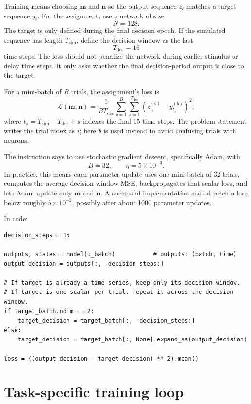 \documentclass[11pt]{article}
\newcommand{\vm}{\mathbf{m}}
\newcommand{\vn}{\mathbf{n}}
\begin{document}
Training means choosing $\vm$ and $\vn$ so the output sequence $z_t$ matches a
target sequence $y_t$. For the assignment, use a network of size
\[
  N = 128.
\]
The target is only defined during the final decision epoch. If the simulated
sequence has length $T_{\mathrm{sim}}$, define the decision window as the last
\[
  T_{\mathrm{dec}} = 15
\]
time steps. The loss should not penalize the network during earlier stimulus or
delay time steps. It only asks whether the final decision-period output is close
to the target.

For a mini-batch of $B$ trials, the assignment's loss is
\begin{equation}
  \mathcal{L}(\vm,\vn)
  =
  \frac{1}{B T_{\mathrm{dec}}}
  \sum_{b=1}^{B}
  \sum_{s=1}^{T_{\mathrm{dec}}}
  \left(
    z_{t_s}^{(b)} - y_{t_s}^{(b)}
  \right)^2,
  \label{eq:decision_loss}
\end{equation}
where $t_s = T_{\mathrm{sim}} - T_{\mathrm{dec}} + s$ indexes the final
15 time steps. The problem statement writes the trial index as $i$; here $b$ is
used instead to avoid confusing trials with neurons.

The instruction says to use stochastic gradient descent, specifically Adam, with
\[
  B = 32,
  \qquad
  \eta = 5 \times 10^{-3}.
\]
In practice, this means each parameter update uses one mini-batch of 32 trials,
computes the average decision-window MSE, backpropagates that scalar loss, and
lets Adam update only $\vm$ and $\vn$. A successful implementation should reach a
loss below roughly $5 \times 10^{-2}$, possibly after about 1000 parameter
updates.

In code:
\begin{lstlisting}[style=python]
decision_steps = 15

outputs, states = model(u_batch)           # outputs: (batch, time)
output_decision = outputs[:, -decision_steps:]

# If target is already a time series, keep only its decision window.
# If target is one scalar per trial, repeat it across the decision window.
if target_batch.ndim == 2:
    target_decision = target_batch[:, -decision_steps:]
else:
    target_decision = target_batch[:, None].expand_as(output_decision)

loss = ((output_decision - target_decision) ** 2).mean()
\end{lstlisting}

\section{Task-specific training loop}
\end{document}
